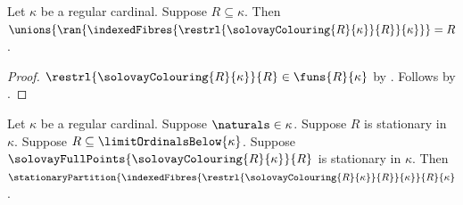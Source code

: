 \begin{proposition}\label{solovay_cells_cover}
    Let $\kappa$ be a regular cardinal.
    Suppose $R\subseteq\kappa$.
    Then $\unions{\ran{
        \indexedFibres{\restrl{\solovayColouring{R}{\kappa}}{R}}{\kappa}}}
        =R$.
\end{proposition}
\begin{proof}
    $\restrl{\solovayColouring{R}{\kappa}}{R}\in\funs{R}{\kappa}$
        by .
    Follows by .
\end{proof}

\begin{theorem}\label{solovay_full_points_give_partition}
    Let $\kappa$ be a regular cardinal.
    Suppose $\naturals\in\kappa$.
    Suppose $R$ is stationary in $\kappa$.
    Suppose $R\subseteq\limitOrdinalsBelow{\kappa}$.
    Suppose $\solovayFullPoints{\solovayColouring{R}{\kappa}}{R}$
        is stationary in $\kappa$.
    Then $\stationaryPartition{
        \indexedFibres{\restrl{\solovayColouring{R}{\kappa}}{R}}{\kappa}}
        {R}{\kappa}$.
\end{theorem}
